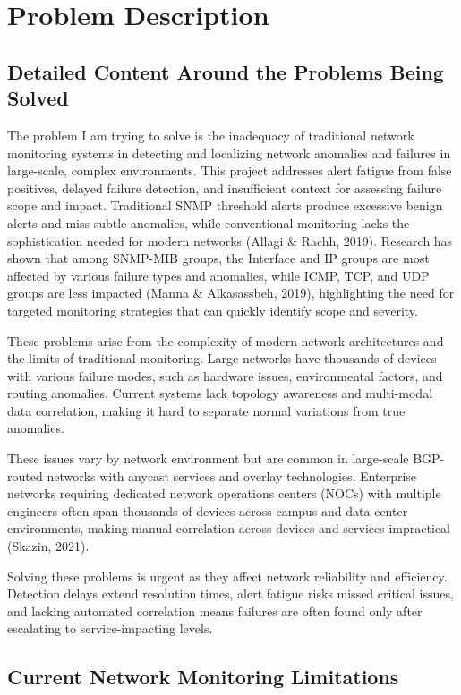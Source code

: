 \documentclass[11pt]{article}
\begin{document}
\section{Problem Description}

\subsection{Detailed Content Around the Problems Being Solved}

The problem I am trying to solve is the inadequacy of traditional network monitoring systems in detecting and localizing network anomalies and failures in large-scale, complex environments. This project addresses alert fatigue from false positives, delayed failure detection, and insufficient context for assessing failure scope and impact. Traditional SNMP threshold alerts produce excessive benign alerts and miss subtle anomalies, while conventional monitoring lacks the sophistication needed for modern networks (Allagi \& Rachh, 2019). Research has shown that among SNMP-MIB groups, the Interface and IP groups are most affected by various failure types and anomalies, while ICMP, TCP, and UDP groups are less impacted (Manna \& Alkasassbeh, 2019), highlighting the need for targeted monitoring strategies that can quickly identify scope and severity.

These problems arise from the complexity of modern network architectures and the limits of traditional monitoring. Large networks have thousands of devices with various failure modes, such as hardware issues, environmental factors, and routing anomalies. Current systems lack topology awareness and multi-modal data correlation, making it hard to separate normal variations from true anomalies.

These issues vary by network environment but are common in large-scale BGP-routed networks with anycast services and overlay technologies. Enterprise networks requiring dedicated network operations centers (NOCs) with multiple engineers often span thousands of devices across campus and data center environments, making manual correlation across devices and services impractical (Skazin, 2021).

Solving these problems is urgent as they affect network reliability and efficiency. Detection delays extend resolution times, alert fatigue risks missed critical issues, and lacking automated correlation means failures are often found only after escalating to service-impacting levels.

\subsection{Current Network Monitoring Limitations}
\end{document}

